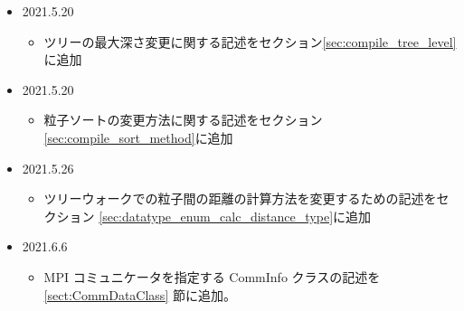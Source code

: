 \begin{itemize}
  \item 2021.5.20
    \begin{itemize}
    \item ツリーの最大深さ変更に関する記述をセクション\ref{sec:compile_tree_level}に追加
    \end{itemize}

  \item 2021.5.20
    \begin{itemize}
    \item 粒子ソートの変更方法に関する記述をセクション\ref{sec:compile_sort_method}に追加
    \end{itemize}

  \item 2021.5.26
    \begin{itemize}
    \item ツリーウォークでの粒子間の距離の計算方法を変更するための記述をセクション
      \ref{sec:datatype_enum_calc_distance_type}に追加
    \end{itemize}

  \item 2021.6.6
    \begin{itemize}
    \item MPI コミュニケータを指定する CommInfo クラスの記述を
      \ref{sect:CommDataClass} 節に追加。
    \end{itemize}
    
\end{itemize}
